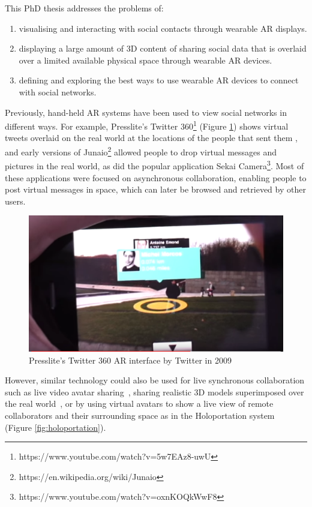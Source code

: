 This PhD thesis addresses the problems of: 
\begin{enumerate}
    \item visualising and interacting with social contacts through wearable AR displays.
    \item displaying a large amount of 3D content of sharing social data that is overlaid over a limited available physical space through wearable AR devices.
    \item defining and exploring the best ways to use wearable AR devices to connect with social networks.
\end{enumerate}

Previously, hand-held AR systems have been used to view social networks in different ways. For example, Presslite's Twitter 360\footnote{https://www.youtube.com/watch?v=5w7EAz8-uwU} (Figure \ref{fig:presslite}) shows virtual tweets overlaid on the real world at the locations of the people that sent them , and early versions of Junaio\footnote{https://en.wikipedia.org/wiki/Junaio} allowed people to drop virtual messages and pictures in the real world, as did the popular application Sekai Camera\footnote{https://www.youtube.com/watch?v=oxnKOQkWwF8}. Most of these applications were focused on asynchronous collaboration, enabling people to post virtual messages in space, which can later be browsed and retrieved by other users. 

\begin{figure}
    \centering
    \includegraphics[width=0.8\linewidth]{images/10-intro/Presslite-twitter-360.PNG}
    \caption{Presslite's Twitter 360 AR interface by Twitter in 2009}
    \label{fig:presslite}
\end{figure}

However, similar technology could also be used for live synchronous collaboration such as live video avatar sharing~\cite{Billinghurst2002}, sharing realistic 3D models superimposed over the real world~\cite{Fanello2016}, or by using virtual avatars to show a live view of remote collaborators and their surrounding space as in the Holoportation system~\cite{Fanello2016} (Figure \ref{fig:holoportation}).

